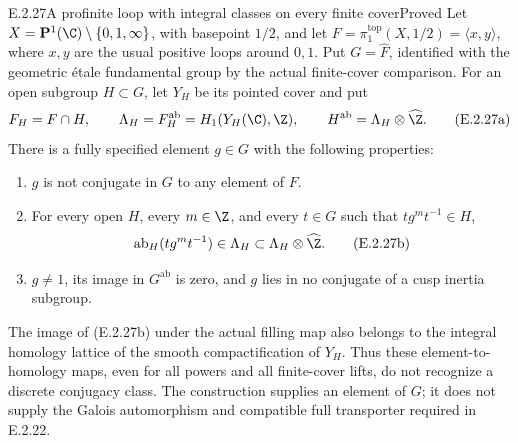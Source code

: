 \begin{result}{E.2.27}{A profinite loop with integral classes on every finite cover}{Proved}
Let \(X=\mathbf P^1(\C)\setminus\{0,1,\infty\}\), with basepoint
\(1/2\), and let \(F=\pi_1^{\mathrm{top}}(X,1/2)=\langle x,y\rangle\),
where \(x,y\) are the usual positive loops around \(0,1\).
Put \(G=\widehat F\), identified with the geometric \'{e}tale
fundamental group by the actual finite-cover comparison.
For an open subgroup \(H\subset G\), let \(Y_H\) be its pointed cover
and put
\[
 F_H=F\cap H,\qquad
 \Lambda_H=F_H^{\mathrm{ab}}=H_1(Y_H(\C),\Z),\qquad
 H^{\mathrm{ab}}=\Lambda_H\otimes\widehat\Z.
 \tag{E.2.27a}
\]
There is a fully specified element \(g\in G\) with the following
properties:
\begin{enumerate}
\item \(g\) is not conjugate in \(G\) to any element of \(F\).
\item For every open \(H\), every \(m\in\Z\), and every \(t\in G\)
such that \(tg^mt^{-1}\in H\),
\[
 \operatorname{ab}_H(tg^mt^{-1})\in\Lambda_H
       \subset\Lambda_H\otimes\widehat\Z.
 \tag{E.2.27b}
\]
\item \(g\neq1\), its image in \(G^{\mathrm{ab}}\) is zero, and
\(g\) lies in no conjugate of a cusp inertia subgroup.
\end{enumerate}
The image of (E.2.27b) under the actual filling map also belongs to
the integral homology lattice of the smooth compactification of
\(Y_H\). Thus these element-to-homology maps, even for all powers
and all finite-cover lifts, do not recognize a discrete conjugacy
class. The construction supplies an element of \(G\); it does not
supply the Galois automorphism and compatible full transporter
required in E.2.22.
\end{result}
